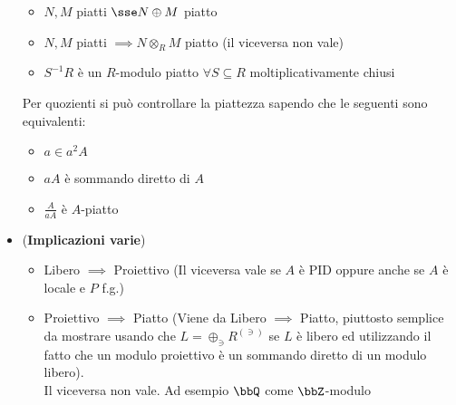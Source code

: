 \documentclass[a4paper,NoNotes,GeneralMath]{stdmdoc}
\begin{document}
\begin{itemize}
\begin{itemize}
				\item $N, M$ piatti $\sse N \oplus M$ piatto
				\item $N, M$ piatti $\implies N \otimes_R M$ piatto (il viceversa non vale)
				\item $S^{-1}R$ è un $R$-modulo piatto $\forall S \subseteq R$ moltiplicativamente chiusi
			\end{itemize}
			Per quozienti si può controllare la piattezza sapendo che le seguenti sono equivalenti:
			\begin{itemize}
				\item $a \in a^2A$
				\item $aA$ è sommando diretto di $A$
				\item $\frac{A}{aA}$ è $A$-piatto
			\end{itemize}
		\item ({\bf Implicazioni varie})
			\begin{itemize}
				\item Libero $\implies$ Proiettivo (Il viceversa vale se $A$ è PID oppure anche se $A$ è locale e $P$ f.g.)
				\item Proiettivo $\implies$ Piatto (Viene da Libero $\implies$ Piatto, piuttosto semplice da mostrare usando che $L = \oplus_\ni R^{(\ni)}$ se $L$ è libero ed utilizzando il fatto che un modulo proiettivo è un sommando diretto di un modulo libero). \\ Il viceversa non vale. Ad esempio $\bbQ$ come $\bbZ$-modulo
			\end{itemize}
	\end{itemize}
	
\end{document}
